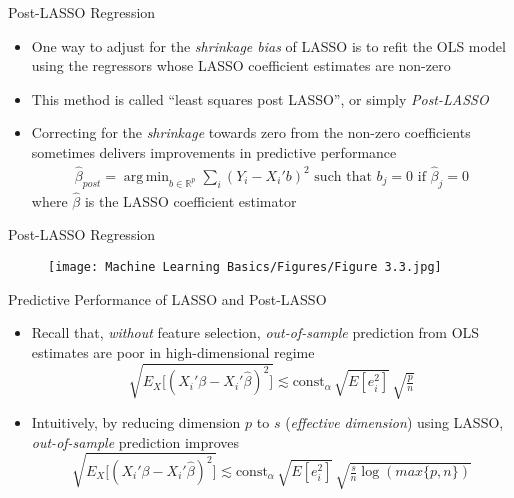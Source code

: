 \documentclass[aspectratio=1610,12pt,xcolor=dvipsnames]{beamer}
\DeclareMathOperator*{\argmin}{arg\,min}
\begin{document}
\begin{frame}{Post-LASSO Regression}

\begin{itemize}
    \item One way to adjust for the \textit{shrinkage bias} of LASSO is to refit the OLS model using the regressors whose LASSO coefficient estimates are non-zero
    \item This method is called ``least squares post LASSO'', or simply \textit{Post-LASSO}
    \item Correcting for the \textit{shrinkage} towards zero from the non-zero coefficients sometimes delivers improvements in predictive performance 
    \begin{align*}
        \hat \beta_{post} = \argmin_{b\in\mathbb{R}^p} \sum_{i}(Y_i - X_i'b)^2 \text{ such that } b_j=0 \text{ if } \hat{\beta}_j = 0
    \end{align*}
    where $\hat \beta$ is the LASSO coefficient estimator
\end{itemize}
\end{frame}

\begin{frame}{Post-LASSO Regression}

\begin{figure}
    \centering
    \texttt{[image: Machine Learning Basics/Figures/Figure 3.3.jpg]}
    \label{fig:figure 3.3}
\end{figure}
\end{frame}

\begin{frame}{Predictive Performance of LASSO and Post-LASSO}

\begin{itemize}
    \item Recall that, \textit{without} feature selection, \textit{out-of-sample} prediction from OLS estimates are poor in high-dimensional regime
    \[
    \sqrt{E_X\!\big[(X_i'\beta - X_i'\hat\beta)^2\big]}
    \lesssim\text{const}_{\alpha}\,\sqrt{E[e_i^2]}\,\sqrt{\tfrac{p}{n}}
    \]
    \item Intuitively, by reducing dimension $p$ to $s$ (\textit{effective dimension}) using LASSO, \textit{out-of-sample} prediction improves
    \[
    \sqrt{E_X\!\big[(X_i'\beta - X_i'\hat\beta)^2\big]}
    \lesssim\text{const}_{\alpha}\,\sqrt{E[e_i^2]}\,\sqrt{\tfrac{s}{n}\log(max\{p,n\})}
    \]
\end{itemize}
\end{frame}
\end{document}
